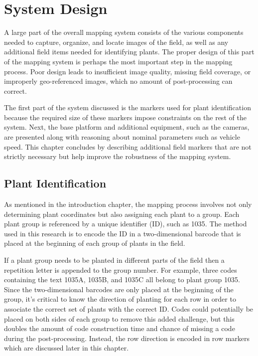 
\cleardoublepage

\chapter{System Design}
\label{chapter:system_design}

A large part of the overall mapping system consists of the various components needed to capture, organize, and locate images of the field, as well as any additional field items needed for identifying plants.  The proper design of this part of the mapping system is perhaps the most important step in the mapping process.  Poor design leads to insufficient image quality, missing field coverage, or improperly geo-referenced images, which no amount of post-processing can correct.  

The first part of the system discussed is the markers used for plant identification because the required size of these markers impose constraints on the rest of the system.  Next, the base platform and additional equipment, such as the cameras, are presented along with reasoning about nominal parameters such as vehicle speed.  This chapter concludes by describing additional field markers that are not strictly necessary but help improve the robustness of the mapping system. 

\section{Plant Identification}
\label{section:plantid}

As mentioned in the introduction chapter, the mapping process involves not only determining plant coordinates but also assigning each plant to a group.  Each plant group is referenced by a unique identifier (ID), such as 1035.  The method used in this research is to encode the ID in a two-dimensional barcode that is placed at the beginning of each group of plants in the field. 

If a plant group needs to be planted in different parts of the field then a repetition letter is appended to the group number.  For example, three codes containing the text 1035A, 1035B, and 1035C all belong to plant group 1035.  Since the two-dimensional barcodes are only placed at the beginning of the group, it's critical to know the direction of planting for each row in order to associate the correct set of plants with the correct ID.  Codes could potentially be placed on both sides of each group to remove this added challenge, but this doubles the amount of code construction time and chance of missing a code during the post-processing.  Instead, the row direction is encoded in row markers which are discussed later in this chapter.

